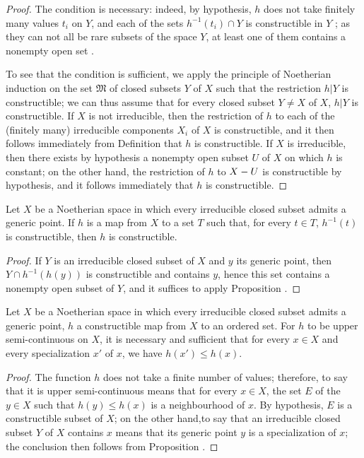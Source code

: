 \begin{proof}
The condition is necessary: indeed, by hypothesis, $h$ does not take finitely many values $t_i$ on $Y$, and each of the sets $h^{-1}(t_i)\cap Y$ is constructible in $Y$ ; as they can not all be rare subsets of the space $Y$, at least one of them contains a nonempty open set .

To see that the condition is sufficient, we apply the principle of Noetherian induction on the set $\mathfrak{M}$ of closed subsets $Y$ of $X$ such that the restriction $h|Y$ is constructible; we can thus assume that for every closed subset $Y\neq X$ of $X$,
$h|Y$ is constructible.
If $X$ is not irreducible, then the restriction of $h$ to each of the (finitely many) irreducible components $X_i$ of $X$ is constructible, and it then follows immediately from Definition  that $h$ is constructible.
If $X$ is irreducible, then there exists by hypothesis a nonempty open subset $U$ of $X$ on which $h$ is constant; on the other hand, the restriction of $h$ to $X- U$ is constructible by hypothesis, and it follows immediately that $h$ is constructible.
\end{proof}

\begin{corollary}[9.3.3]
\label{0.9.3.3}
Let $X$ be a Noetherian space in which every irreducible closed subset admits a generic point.
If $h$ is a map from $X$ to a set $T$ such that, for every $t\in T$, $h^{-1}(t)$ is constructible, then $h$ is constructible.
\end{corollary}

\begin{proof}
If $Y$ is an irreducible closed subset of $X$ and $y$ its generic point, then $Y\cap h^{-1}(h(y))$ is constructible and contains $y$, hence  this set contains a nonempty open subset of $Y$, and it suffices to apply Proposition .
\end{proof}

\begin{proposition}[9.3.4]
\label{0.9.3.4}
Let $X$ be a Noetherian space in which every irreducible closed subset admits a generic point, $h$ a constructible map from $X$ to an ordered set.
For $h$ to be upper semi-continuous on $X$, it is necessary and sufficient that for every $x\in X$ and every specialization  $x'$ of $x$, we have $h(x')\leq h(x)$.
\end{proposition}

\begin{proof}
The function $h$ does not take a finite number of values; therefore, to say that it is upper semi-continuous means that for every $x\in X$, the set $E$ of the $y\in X$ such that $h(y)\leq h(x)$ is a neighbourhood of $x$.
By hypothesis, $E$ is a constructible subset of $X$; on the other hand,to say that an irreducible closed subset $Y$ of $X$ contains $x$ means that its generic point $y$ is a specialization of $x$; the conclusion then follows from Proposition .
\end{proof}

